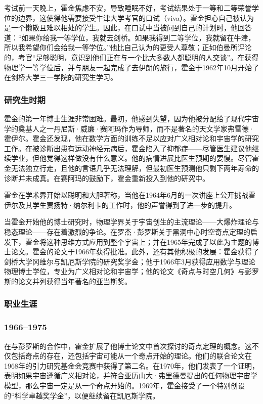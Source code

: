 考试前一天晚上，霍金焦虑不安，导致睡眠不好，考试结果处于一等和二等荣誉学位的边界，这使得他需要接受牛津大学考官的口试（viva）。霍金担心自己被认为是一个懒散且难以相处的学生。因此，在口试中当被问到自己的计划时，他回答道：“如果你给我一等学位，我就去剑桥。如果我得到二等学位，我就留在牛津，所以我希望你们会给我一等学位。”他比自己认为的更受人尊敬；正如伯曼所评论的，考官“足够聪明，意识到他们正在与一个比大多数人都聪明的人交谈”。在获得物理学一等学位后，并与朋友一起完成了去伊朗的旅行，霍金于1962年10月开始了在剑桥大学三一学院的研究生学习。
\subsubsection{研究生时期}
霍金的第一年博士生涯非常困难。最初，他感到失望，因为他被分配给了现代宇宙学的奠基人之一丹尼斯·威廉·赛阿玛作为导师，而不是著名的天文学家弗雷德·霍伊尔。霍金还发现，他在数学方面的训练不足以应对广义相对论和宇宙学的研究工作。在被诊断出患有运动神经元病后，霍金陷入了抑郁症——尽管医生建议他继续学业，但他觉得这样做没有什么意义。他的病情进展比医生预期的要慢。尽管霍金无法独立行走，且他的言语几乎无法理解，但最初医生预测他只剩下两年寿命的诊断并未成真。在赛阿玛的鼓励下，霍金重新投入到他的研究中。

霍金在学术界开始以聪明和大胆著称，当他在1964年6月的一次讲座上公开挑战霍伊尔及其学生贾扬特·纳尔利卡的工作时，他的声誉得到了进一步的提升。

当霍金开始他的博士研究时，物理学界关于宇宙创生的主流理论——大爆炸理论与稳态理论——存在着激烈的争论。在罗杰·彭罗斯关于黑洞中心时空奇点定理的启发下，霍金将这种思维方式应用到整个宇宙上；并在1965年完成了以此为主题的博士论文。霍金的论文于1966年获得批准。此外，还有其他积极的发展：霍金获得了剑桥大学冈维尔与凯厄斯学院的研究奖学金；他于1966年3月获得应用数学与理论物理博士学位，专业为广义相对论和宇宙学；他的论文《奇点与时空几何》与彭罗斯的论文并列获得当年著名的亚当斯奖。
\subsubsection{职业生涯}  
\subsubsection{1966–1975}  
在与彭罗斯的合作中，霍金扩展了他博士论文中首次探讨的奇点定理的概念。这不仅包括奇点的存在，还包括宇宙可能从一个奇点开始的理论。他们的联合论文在1968年的引力研究基金会竞赛中获得了第二名。在1970年，他们发表了一个证明，表明如果宇宙遵循广义相对论，并符合亚历山大·弗里德曼提出的任何物理宇宙学模型，那么宇宙一定是从一个奇点开始的。1969年，霍金接受了一个特别创设的“科学卓越奖学金”，以便继续留在凯厄斯学院。

